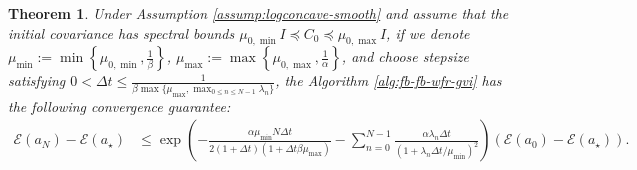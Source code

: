 \documentclass[11pt]{article}
\theoremstyle{plain}
\newtheorem{theorem}{Theorem}[section]
\theoremstyle{definition}
\theoremstyle{remark}
\begin{document}
\begin{theorem}\label{thm:conv-fb-wfr}
    Under Assumption \ref{assump:logconcave-smooth} and assume that the initial covariance has spectral bounds $\mu_{0, \min} I \preceq C_0 \preceq \mu_{0, \max} I$, if we denote $\mu_{\min} := \min \left\{ \mu_{0, \min}, \frac{1}{\beta} \right\}$, $\mu_{\max} := \max \left\{ \mu_{0, \max}, \frac{1}{\alpha} \right\}$, and choose stepsize satisfying $0 < \Delta t \leq \frac{1}{ \beta\max \{\mu_{\max}, \max_{0 \leq n \leq N-1} \lambda_n \}}$, the Algorithm \ref{alg:fb-fb-wfr-gvi} has the following convergence guarantee:
    \begin{align*}
        \mathcal{E} (a_N) - \mathcal{E} (a_\star) &\leq \exp \left( - \frac{\alpha \mu_{\min} N \Delta t}{2 (1 + \Delta t) (1 + \Delta t \beta \mu_{\max})} - \sum_{n=0}^{N-1} \frac{\alpha \lambda_n \Delta t}{(1 + \lambda_n \Delta t / \mu_{\min})^2} \right) (\mathcal{E} (a_0) - \mathcal{E} (a_\star)).
    \end{align*}
\end{theorem}
\end{document}
